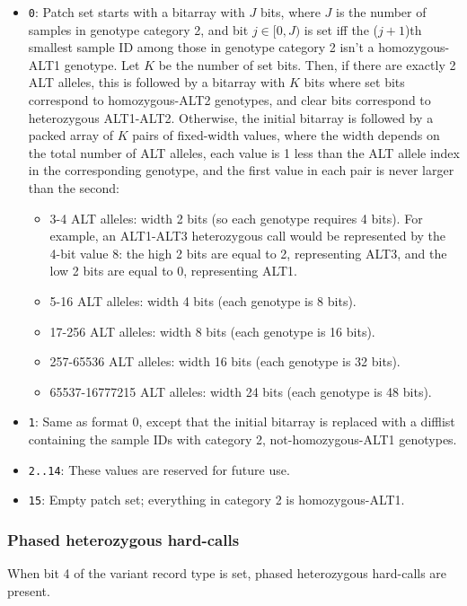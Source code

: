 \documentclass[8pt]{article}
\begin{document}
\begin{itemize}
\item \texttt{0}: Patch set starts with a bitarray with $J$ bits, where $J$ is
  the number of samples in genotype category 2, and bit $j\in [0, J)$ is set
  iff the ($j+1$)th smallest sample ID among those in genotype category 2 isn't
  a homozygous-ALT1 genotype.  Let $K$ be the number of set bits.  Then, if
  there are exactly 2 ALT alleles, this is followed by a bitarray with $K$ bits
  where set bits correspond to homozygous-ALT2 genotypes, and clear bits
  correspond to heterozygous ALT1-ALT2.  Otherwise, the initial bitarray is
  followed by a packed array of $K$ pairs of fixed-width values, where the
  width depends on the total number of ALT alleles, each value is 1 less than
  the ALT allele index in the corresponding genotype, and the first value in
  each pair is never larger than the second:
  \begin{itemize}
  \item 3-4 ALT alleles: width 2 bits (so each genotype requires 4 bits).  For
    example, an ALT1-ALT3 heterozygous call would be represented by the 4-bit
    value 8: the high 2 bits are equal to 2, representing ALT3, and the low 2
    bits are equal to 0, representing ALT1.
  \item 5-16 ALT alleles: width 4 bits (each genotype is 8 bits).
  \item 17-256 ALT alleles: width 8 bits (each genotype is 16 bits).
  \item 257-65536 ALT alleles: width 16 bits (each genotype is 32 bits).
  \item 65537-16777215 ALT alleles: width 24 bits (each genotype is 48 bits).
  \end{itemize}
\item \texttt{1}: Same as format 0, except that the initial bitarray is
  replaced with a difflist containing the sample IDs with category 2,
  not-homozygous-ALT1 genotypes.
\item \texttt{2..14}: These values are reserved for future use.
\item \texttt{15}: Empty patch set; everything in category 2 is
  homozygous-ALT1.
\end{itemize}

\subsubsection{Phased heterozygous hard-calls}

When bit 4 of the variant record type is set, phased heterozygous hard-calls
are present.
\end{document}
